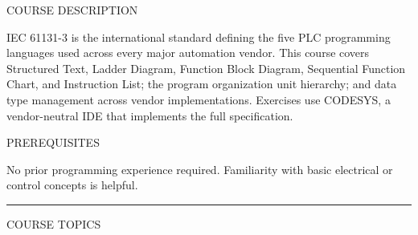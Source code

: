 \documentclass[10pt]{article}
\begin{document}

\vspace{0.70in}

{\small\sffamily\color{igray}\MakeUppercase{Course Description}}
\smallskip

{\small IEC 61131-3 is the international standard defining the five PLC programming languages used across every major automation vendor. This course covers Structured Text, Ladder Diagram, Function Block Diagram, Sequential Function Chart, and Instruction List; the program organization unit hierarchy; and data type management across vendor implementations. Exercises use CODESYS, a vendor-neutral IDE that implements the full specification.}

\smallskip
{\small\sffamily\color{igray}\MakeUppercase{Prerequisites}}
\smallskip

{\small No prior programming experience required. Familiarity with basic electrical or control concepts is helpful.}

\smallskip
{\color{inavy}\rule{\linewidth}{1.2pt}}
\smallskip
{\small\sffamily\color{igray}\MakeUppercase{Course Topics}}
\smallskip
\end{document}
